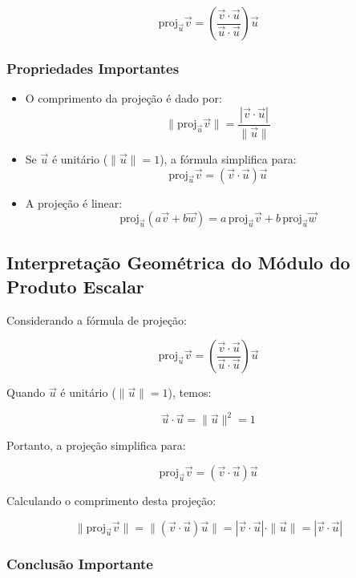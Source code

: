 \begin{equation}
  \text{proj}_{\vec{u}} \vec{v} = \left( \frac{\vec{v} \cdot \vec{u}}{\vec{u} \cdot \vec{u}} \right) \vec{u}
  \label{eq:formula_projecao}
\end{equation}

\subsubsection*{Propriedades Importantes}
\begin{itemize}
  \item O comprimento da projeção é dado por:
  \[
  \|\text{proj}_{\vec{u}} \vec{v}\| = \frac{|\vec{v} \cdot \vec{u}|}{\|\vec{u}\|}
  \]
  
  \item Se $\vec{u}$ é unitário ($\|\vec{u}\| = 1$), a fórmula simplifica para:
  \[
  \text{proj}_{\vec{u}} \vec{v} = (\vec{v} \cdot \vec{u}) \vec{u}
  \]
  
  \item A projeção é linear:
  \[
  \text{proj}_{\vec{u}} (a\vec{v} + b\vec{w}) = a\,\text{proj}_{\vec{u}} \vec{v} + b\,\text{proj}_{\vec{u}} \vec{w}
  \]
\end{itemize}

\subsection{Interpretação Geométrica do Módulo do Produto Escalar}

Considerando a fórmula de projeção:

\[
\text{proj}_{\vec{u}} \vec{v} = \left( \frac{\vec{v} \cdot \vec{u}}{\vec{u} \cdot \vec{u}} \right) \vec{u}
\]

Quando $\vec{u}$ é unitário ($\|\vec{u}\| = 1$), temos:

\[
\vec{u} \cdot \vec{u} = \|\vec{u}\|^2 = 1
\]

Portanto, a projeção simplifica para:

\begin{equation}
\text{proj}_{\vec{u}} \vec{v} = (\vec{v} \cdot \vec{u}) \vec{u}
\label{eq:proj_vetor_unitario}
\end{equation}

Calculando o comprimento desta projeção:

\[
\|\text{proj}_{\vec{u}} \vec{v}\| = \|(\vec{v} \cdot \vec{u}) \vec{u}\| = |\vec{v} \cdot \vec{u}| \cdot \|\vec{u}\| = |\vec{v} \cdot \vec{u}|
\]

\subsubsection*{Conclusão Importante}

